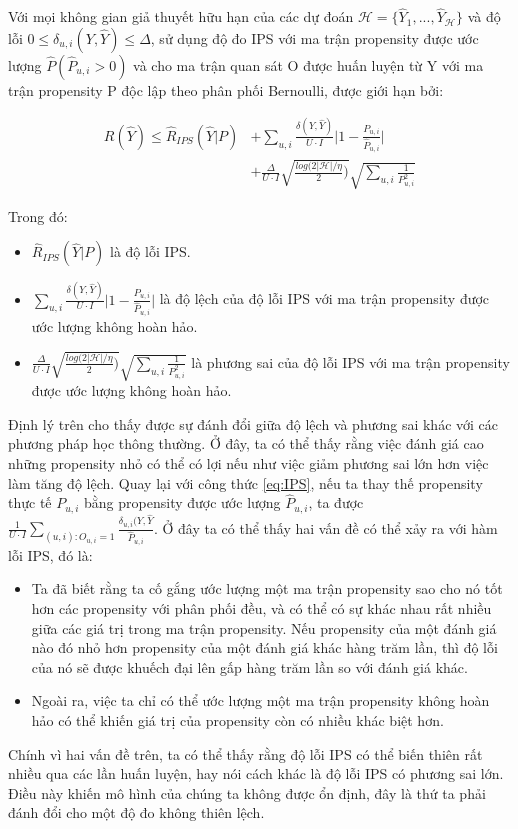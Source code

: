 \begin{theorem}
    Với mọi không gian giả thuyết hữu hạn của các dự đoán $\mathcal{H} = \{\hat{Y}_1,...,\hat{Y}_{\mathcal{H}}\}$ và độ lỗi $0 \leqslant \delta_{u,i}(Y,\hat{Y}) \leqslant \Delta$, sử dụng độ đo IPS với ma trận propensity được ước lượng $\hat{P} (\hat{P}_{u,i} > 0)$ và cho ma trận quan sát O được huấn luyện từ Y với ma trận propensity P độc lập theo phân phối Bernoulli, được giới hạn bởi:
    
    \begin{equation}
    \begin{aligned}
        \label{eq:bound_erm}
        R(\hat{Y}) \leqslant \hat{R}_{IPS}(\hat{Y}|P) 
        & + \sum_{u,i} \frac{\delta(Y, \hat{Y})}{U \cdot I} \Bigg|1-\frac{P_{u,i}}{\hat{P}_{u,i}}\Bigg| \\ &+ \frac{\Delta}{U \cdot I} \sqrt{\frac{log(2|\mathcal{H}| / \eta}{2})} \sqrt{\sum_{u,i} \frac{1}{P^2_{u,i}}}
    \end{aligned}
    \end{equation}
    
\end{theorem}
Trong đó:
\begin{itemize}
    \item $\hat{R}_{IPS}(\hat{Y}|P)$ là độ lỗi IPS.
    \item $\sum_{u,i} \frac{\delta(Y, \hat{Y})}{U \cdot I} \Bigg|1-\frac{P_{u,i}}{\hat{P}_{u,i}}\Bigg|$ là độ lệch của độ lỗi IPS với ma trận propensity được ước lượng không hoàn hảo.
    \item $\frac{\Delta}{U \cdot I} \sqrt{\frac{log(2|\mathcal{H}| / \eta}{2})} \sqrt{\sum_{u,i} \frac{1}{P^2_{u,i}}}$ là phương sai của độ lỗi IPS với ma trận propensity được ước lượng không hoàn hảo.
\end{itemize}
Định lý trên cho thấy được sự đánh đổi giữa độ lệch và phương sai khác với các phương pháp học thông thường. Ở đây, ta có thể thấy rằng việc đánh giá cao những propensity nhỏ có thể có lợi nếu như việc giảm phương sai lớn hơn việc làm tăng độ lệch. Quay lại với công thức \ref{eq:IPS}, nếu ta thay thế propensity thực tế $P_{u,i}$ bằng propensity được ước lượng $\hat{P}_{u,i}$, ta được  $ \frac{1}{U \cdot I} \sum_{(u,i): O_{u,i} = 1} \frac{\delta_{u,i}(Y, \hat{Y}}{\hat{P}_{u,i}}$. Ở đây ta có thể thấy hai vấn đề có thể xảy ra với hàm lỗi IPS, đó là:
\begin{itemize}
    \item Ta đã biết rằng ta cố gắng ước lượng một ma trận propensity sao cho nó tốt hơn các propensity với phân phối đều, và có thể có sự khác nhau rất nhiều giữa các giá trị trong ma trận propensity. Nếu propensity của một đánh giá nào đó nhỏ hơn propensity của một đánh giá khác hàng trăm lần, thì độ lỗi của nó sẽ được khuếch đại lên gấp hàng trăm lần so với đánh giá khác.
    \item Ngoài ra, việc ta chỉ có thể ước lượng một ma trận propensity không hoàn hảo có thể khiến giá trị của propensity còn có nhiều khác biệt hơn.
\end{itemize}

Chính vì hai vấn đề trên, ta có thể thấy rằng độ lỗi IPS có thể biến thiên rất nhiều qua các lần huấn luyện, hay nói cách khác là độ lỗi IPS có phương sai lớn. Điều này khiến mô hình của chúng ta không được ổn định, đây là thứ ta phải đánh đổi cho một độ đo không thiên lệch. 
